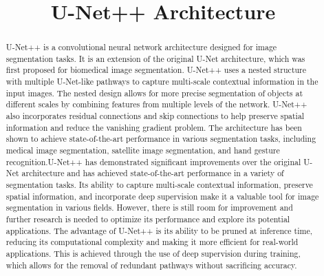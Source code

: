 \documentclass[conference]{IEEEtran}
\begin{document}
\title{U-Net++ Architecture\\
}

\author{
\and
{}
\and
{}
}

\maketitle

\begin{abstract}
U-Net++ is a convolutional neural network architecture designed for image segmentation tasks. It is an extension of the original U-Net architecture, which was first proposed for biomedical image segmentation. U-Net++ uses a nested structure with multiple U-Net-like pathways to capture multi-scale contextual information in the input images. The nested design allows for more precise segmentation of objects at different scales by combining features from multiple levels of the network. U-Net++ also incorporates residual connections and skip connections to help preserve spatial information and reduce the vanishing gradient problem. The architecture has been shown to achieve state-of-the-art performance in various segmentation tasks, including medical image segmentation, satellite image segmentation, and hand gesture recognition.U-Net++ has demonstrated significant improvements over the original U-Net architecture and has achieved state-of-the-art performance in a variety of segmentation tasks. Its ability to capture multi-scale contextual information, preserve spatial information, and incorporate deep supervision make it a valuable tool for image segmentation in various fields. However, there is still room for improvement and further research is needed to optimize its performance and explore its potential applications. The advantage of U-Net++ is its ability to be pruned at inference time, reducing its computational complexity and making it more efficient for real-world applications. This is achieved through the use of deep supervision during training, which allows for the removal of redundant pathways without sacrificing accuracy.






\end{abstract}
\end{document}
